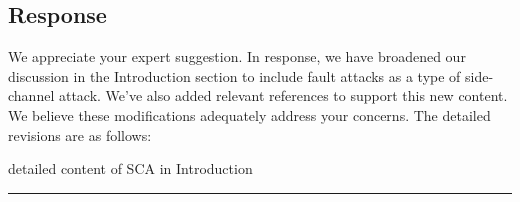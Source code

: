 \subsection{Response}

We appreciate your expert suggestion. In response, we have broadened our discussion in the Introduction section to include fault attacks as a type of side-channel attack. We've also added relevant references to support this new content. We believe these modifications adequately address your concerns. The detailed revisions are as follows:

\color{blue}

detailed content of SCA in Introduction

	

\color{black}


\noindent\rule{\linewidth}{6.0pt}
